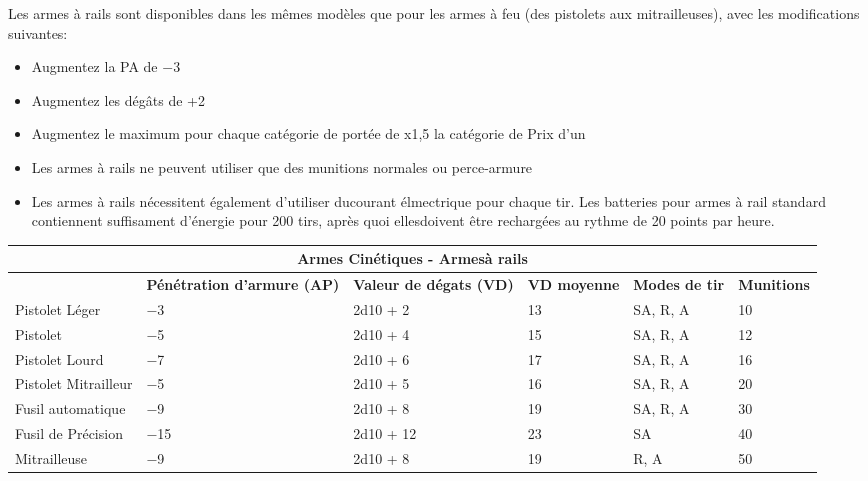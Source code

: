 Les armes à rails sont disponibles dans les mêmes modèles que pour les armes à feu (des pistolets aux mitrailleuses), avec les modifications suivantes: 

\begin{itemize} \item Augmentez la PA de $-$3 \item Augmentez les dégâts de +2 \item Augmentez le maximum pour chaque catégorie de portée de x1,5 \itemAugmentez la catégorie de Prix d'un \item Les armes à rails ne peuvent utiliser que des munitions normales ou perce-armure \item Les armes à rails nécessitent également d'utiliser ducourant élmectrique pour chaque tir. Les batteries pour armes à rail standard contiennent suffisament d'énergie pour 200 tirs, après quoi ellesdoivent être rechargées au rythme de 20 points par heure. \end{itemize} 

\begin{table} \begin{tabularx}{\textwidth}{|l|X|X|X|X|l|} \hline

\multicolumn{6}{|c|}{\textbf{Armes Cinétiques - Armesà rails}} \\ \hline

&\textbf{Pénétration d'armure (AP)}	&\textbf{Valeur de dégats (VD)}	&\textbf{VD moyenne}	&\textbf{Modes de tir}	&\textbf{Munitions} \\ \hline

Pistolet Léger	&$-$3	&2d10 + 2	&13	&SA, R, A	&10 \\ \hline

Pistolet	&$-$5	&2d10 + 4	&15	&SA, R, A	&12 \\ \hline

Pistolet Lourd	&$-$7	&2d10 + 6	&17	&SA, R, A	&16 \\ \hline

Pistolet Mitrailleur &$-$5	&2d10 + 5	&16	&SA, R, A	&20 \\ \hline

Fusil automatique	&$-$9	&2d10 + 8	&19	&SA, R, A	&30 \\ \hline

Fusil de Précision	&$-$15	&2d10 + 12	&23	&SA	&40 \\ \hline

Mitrailleuse	&$-$9	&2d10 + 8	&19	&R, A	&50 \\ \hline

\end{tabularx} \label{tab:kinetic-railguns} \end{table} 

